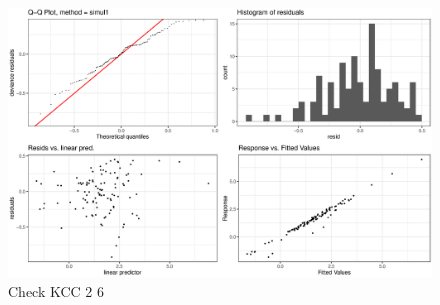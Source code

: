 \begin{figure}[H]
\centering
  \includegraphics[width=0.9\linewidth]{figures/gam_check_kcc_26.eps}
  \caption{Check KCC 2 6}
  \label{fig:gam_check_kcc_26}
\end{figure}





